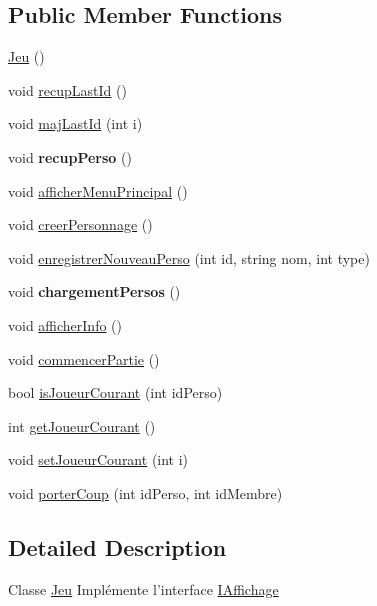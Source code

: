 \subsection*{\-Public \-Member \-Functions}
\begin{DoxyCompactItemize}
\item 
\hyperlink{class_jeu_acc5795ee00edf75516d3dfe65be3e6d6}{\-Jeu} ()
\item 
void \hyperlink{class_jeu_afc8d47d5af8133e555e0e02641dc03c9}{recup\-Last\-Id} ()
\item 
void \hyperlink{class_jeu_ac2dc12316aef3df5ffc04ace0d2ca8a3}{maj\-Last\-Id} (int i)
\item 
\hypertarget{class_jeu_ac24053e79c6d689613eb43f33a849669}{void {\bfseries recup\-Perso} ()}\label{class_jeu_ac24053e79c6d689613eb43f33a849669}

\item 
void \hyperlink{class_jeu_ae02adb2fa1ed4e84bc008fdea4c187a7}{afficher\-Menu\-Principal} ()
\item 
void \hyperlink{class_jeu_add76b474564ae0205343d3b995b43075}{creer\-Personnage} ()
\item 
void \hyperlink{class_jeu_a322a4c1a4084a44b0c5fb1cff5037391}{enregistrer\-Nouveau\-Perso} (int id, string nom, int type)
\item 
\hypertarget{class_jeu_a7dd7448e4889305f0ea21679b16d2df1}{void {\bfseries chargement\-Persos} ()}\label{class_jeu_a7dd7448e4889305f0ea21679b16d2df1}

\item 
void \hyperlink{class_jeu_a40747c204660ad830d76378d0cbac1f0}{afficher\-Info} ()
\item 
void \hyperlink{class_jeu_a0258b4e17a825904fa41213351bcd811}{commencer\-Partie} ()
\item 
bool \hyperlink{class_jeu_a3fe3cdfb2476146d904fd9800eb932f4}{is\-Joueur\-Courant} (int id\-Perso)
\item 
int \hyperlink{class_jeu_acc947eec44204b9f472a8b4b7fb41a25}{get\-Joueur\-Courant} ()
\item 
void \hyperlink{class_jeu_a88d92d04311a3bea94fe4c5972a4dec7}{set\-Joueur\-Courant} (int i)
\item 
void \hyperlink{class_jeu_a7869b56cb07ad313c2227a7d8c470701}{porter\-Coup} (int id\-Perso, int id\-Membre)
\end{DoxyCompactItemize}


\subsection{\-Detailed \-Description}
\-Classe \hyperlink{class_jeu}{\-Jeu} \-Implémente l'interface \hyperlink{class_i_affichage}{\-I\-Affichage} 

